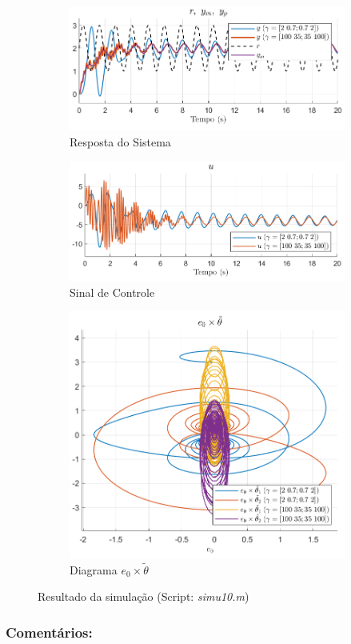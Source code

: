 \documentclass[10pt]{article}
\begin{document}
\begin{figure}[h!]
    \begin{subfigure}[b]{0.25\textwidth}
        \centering
        \includegraphics[width=\textwidth]{img/fig10c.png}
        \caption{Resposta do Sistema}
    \end{subfigure}
    \begin{subfigure}[b]{0.25\textwidth}
        \centering
        \includegraphics[width=\textwidth]{img/fig10e.png}
        \caption{Sinal de Controle}
    \end{subfigure}

    \begin{subfigure}[b]{0.25\textwidth}
        \centering
        \includegraphics[width=\textwidth]{img/fig10d.png}
        \caption{Diagrama $e_0 \times \tilde{\theta}$}
    \end{subfigure}

    \caption{Resultado da simulação (Script: \textit{simu10.m})}
    \label{fig:sim10}
\end{figure}

\subsubsection{Comentários:}
\end{document}
